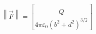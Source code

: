 \documentclass[preview]{standalone}
\begin{document}
\begin{align*}
\left\lVert \vec{F} \right\rVert = \left[ \dfrac{Q}{4 \pi \varepsilon_0 (b^2 + d^2)^{3/2}} \right]
\end{align*}
\end{document}
